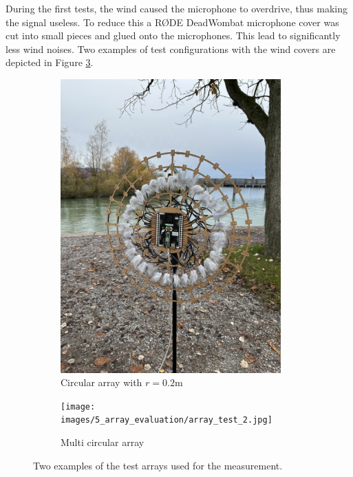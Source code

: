 During the first tests, the wind caused the microphone to overdrive,
thus making the signal useless.
To reduce this a RØDE DeadWombat microphone cover was cut into small pieces
and glued onto the microphones.
This lead to significantly less wind noises.
Two examples of test configurations with the wind covers are depicted in Figure \ref{fig:testSetup}.
\begin{figure}[ht]
	\centering
	\begin{subfigure}[b]{0.49\textwidth}
		\centering
		\includegraphics[width=0.93\textwidth]{images/5_array_evaluation/array_test_1.jpg}
		\caption{Circular array with $r=0.2$m}
		\label{fig:array_test_1}
	\end{subfigure}
	\begin{subfigure}[b]{0.49\textwidth}
		\centering
		\texttt{[image: images/5\_array\_evaluation/array\_test\_2.jpg]}
		\caption{Multi circular array}
		\label{fig:array_test_2}
	\end{subfigure}
	\caption{Two examples of the test arrays used for the measurement.}
	\label{fig:testSetup}
\end{figure}

